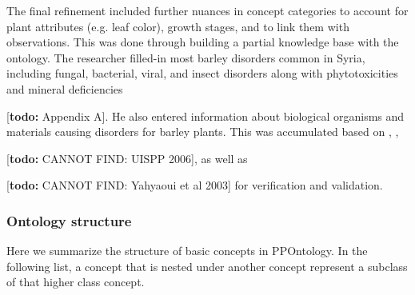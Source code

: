 \documentclass{frontiersSCNS} %
\newcommand{\todo}[1]{
  \rule{0pt}{0pt}\marginpar{{\color{blue}\rule{1ex}{1ex}}}
  {[\textbf{\color{blue}todo:} #1]}}
\begin{document}
The final refinement included further nuances in concept categories to account for plant attributes (e.g. leaf color), growth stages, and to link them with observations. This was done through building a partial knowledge base with the ontology. The researcher filled-in most barley disorders common in Syria, including fungal, bacterial, viral, and insect disorders along with phytotoxicities and mineral deficiencies \todo{Appendix A}. He also entered information about biological organisms and materials causing disorders for barley plants. This was accumulated based on \cite{berkey1992storytelling}, \cite{neate2010barley}, \todo{CANNOT FIND: UISPP 2006}, as well as \todo{CANNOT FIND: Yahyaoui et al 2003}  for verification and validation.

\subsubsection{Ontology structure}
Here we summarize the structure of basic concepts in PPOntology. In the following list, a concept that is nested under another concept represent a subclass of that higher class concept.
\end{document}

